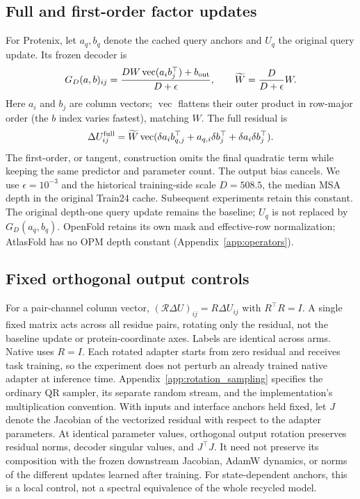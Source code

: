 \subsection{Full and first-order factor updates}
\label{sec:full_tangent}
For Protenix, let $a_q,b_q$ denote the cached query anchors and $U_q$ the
original query update. Its frozen decoder is
\begin{equation}
 G_D(a,b)_{ij}=\frac{D W\operatorname{vec}(a_i b_j^\top)+b_{\rm out}}{D+\epsilon},
 \qquad \widetilde W=\frac{D}{D+\epsilon}W.
\end{equation}
Here $a_i$ and $b_j$ are column vectors; $\operatorname{vec}$ flattens their
outer product in row-major order (the $b$ index varies fastest), matching $W$.
The full residual is
\begin{equation}
 \Delta U^{\rm full}_{ij}=\widetilde W\operatorname{vec}
 (\delta a_i b_{q,j}^\top+a_{q,i}\delta b_j^\top+
 \delta a_i\delta b_j^\top).
 \label{eq:full}
\end{equation}
The first-order, or tangent, construction omits the final quadratic term while
keeping the same predictor and parameter count. The output bias cancels.
We use $\epsilon=10^{-3}$ and the historical training-side scale $D=508.5$, the
median MSA depth in the original Train24 cache. Subsequent experiments retain
this constant. The original depth-one query update remains the baseline;
$U_q$ is not replaced by $G_D(a_q,b_q)$. OpenFold retains its own mask and
effective-row normalization; AtlasFold has no OPM depth constant
(Appendix~\ref{app:operators}).

\subsection{Fixed orthogonal output controls}
\label{sec:rotation}
For a pair-channel column vector,
$(\mathcal R\Delta U)_{ij}=R\Delta U_{ij}$ with $R^\top R=I$.
A single fixed matrix acts across all residue pairs, rotating only the residual,
not the baseline update or protein-coordinate axes. Labels are identical across
arms. Native uses $R=I$. Each rotated adapter
starts from zero residual and receives task training, so the experiment does
not perturb an already trained native adapter at inference time.
Appendix~\ref{app:rotation_sampling} specifies the ordinary QR sampler,
its separate random stream, and the implementation's multiplication convention.
With inputs and interface anchors held fixed, let $J$ denote the Jacobian
of the vectorized residual with respect to the adapter parameters. At
identical parameter values, orthogonal output rotation preserves residual
norms, decoder singular values, and $J^\top J$. It need not preserve
its composition with the frozen downstream Jacobian, AdamW dynamics, or norms
of the different updates learned after training. For state-dependent anchors,
this is a local control, not a spectral equivalence of the whole recycled model.


